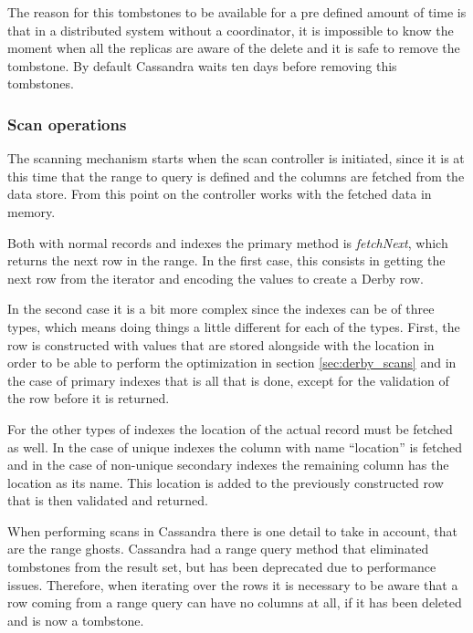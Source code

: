 The reason for this tombstones to be available for a pre defined amount of time is that in a distributed system without a coordinator, it is impossible to know the moment when all the replicas are aware of the delete and it is safe to remove the tombstone. By default Cassandra waits ten days before removing this tombstones.

\subsubsection{Scan operations}
The scanning mechanism starts when the scan controller is initiated, since it is at this time that the range to query is defined and the columns are fetched from the data store. From this point on the controller works with the fetched data in memory.

Both with normal records and indexes the primary method is \emph{fetchNext}, which returns the next row in the range. In the first case, this consists in getting the next row from the iterator and encoding the values to create a Derby row. 

In the second case it is a bit more complex since the indexes can be of three types, which means doing things a little different for each of the types. First, the row is constructed with values that are stored alongside with the location in order to be able to perform the optimization in section \ref{sec:derby_scans} and in the case of primary indexes that is all that is done, except for the validation of the row before it is returned. 

For the other types of indexes the location of the actual record must be fetched as well. In the case of unique indexes the column with name ``location'' is fetched and in the case of non-unique secondary indexes the remaining column has the location as its name. This location is added to the previously constructed row that is then validated and returned.

When performing scans in Cassandra there is one detail to take in account, that are the range ghosts. Cassandra had a range query method that eliminated tombstones from the result set, but has been deprecated due to performance issues. Therefore, when iterating over the rows it is necessary to be aware that a row coming from a range query can have no columns at all, if it has been deleted and is now a tombstone.  

